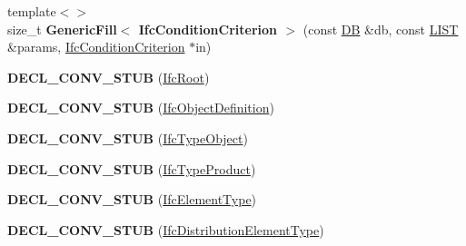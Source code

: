 \begin{DoxyCompactItemize}
\item 
\hypertarget{namespace_assimp_1_1_s_t_e_p_ab615a3b5a5197973a815631e0a058530}{{\footnotesize template$<$$>$ }\\size\+\_\+t {\bfseries Generic\+Fill$<$ Ifc\+Condition\+Criterion $>$} (const \hyperlink{class_assimp_1_1_s_t_e_p_1_1_d_b}{D\+B} \&db, const \hyperlink{class_assimp_1_1_s_t_e_p_1_1_e_x_p_r_e_s_s_1_1_l_i_s_t}{L\+I\+S\+T} \&params, \hyperlink{struct_assimp_1_1_i_f_c_1_1_ifc_condition_criterion}{Ifc\+Condition\+Criterion} $\ast$in)}\label{namespace_assimp_1_1_s_t_e_p_ab615a3b5a5197973a815631e0a058530}

\item 
\hypertarget{namespace_assimp_1_1_s_t_e_p_ae9a162ba612fa18d3e633a23dae32ffc}{{\bfseries D\+E\+C\+L\+\_\+\+C\+O\+N\+V\+\_\+\+S\+T\+U\+B} (\hyperlink{struct_assimp_1_1_i_f_c_1_1_ifc_root}{Ifc\+Root})}\label{namespace_assimp_1_1_s_t_e_p_ae9a162ba612fa18d3e633a23dae32ffc}

\item 
\hypertarget{namespace_assimp_1_1_s_t_e_p_ae728084adb43952848a33ec61d063ce9}{{\bfseries D\+E\+C\+L\+\_\+\+C\+O\+N\+V\+\_\+\+S\+T\+U\+B} (\hyperlink{struct_assimp_1_1_i_f_c_1_1_ifc_object_definition}{Ifc\+Object\+Definition})}\label{namespace_assimp_1_1_s_t_e_p_ae728084adb43952848a33ec61d063ce9}

\item 
\hypertarget{namespace_assimp_1_1_s_t_e_p_aab24e8fcd98e37c6d5ad68ff995aeaa9}{{\bfseries D\+E\+C\+L\+\_\+\+C\+O\+N\+V\+\_\+\+S\+T\+U\+B} (\hyperlink{struct_assimp_1_1_i_f_c_1_1_ifc_type_object}{Ifc\+Type\+Object})}\label{namespace_assimp_1_1_s_t_e_p_aab24e8fcd98e37c6d5ad68ff995aeaa9}

\item 
\hypertarget{namespace_assimp_1_1_s_t_e_p_ae5dd513e88609806922e2d4a7d7b10e2}{{\bfseries D\+E\+C\+L\+\_\+\+C\+O\+N\+V\+\_\+\+S\+T\+U\+B} (\hyperlink{struct_assimp_1_1_i_f_c_1_1_ifc_type_product}{Ifc\+Type\+Product})}\label{namespace_assimp_1_1_s_t_e_p_ae5dd513e88609806922e2d4a7d7b10e2}

\item 
\hypertarget{namespace_assimp_1_1_s_t_e_p_ae273a29a60b383d6e431e1392f3cad8e}{{\bfseries D\+E\+C\+L\+\_\+\+C\+O\+N\+V\+\_\+\+S\+T\+U\+B} (\hyperlink{struct_assimp_1_1_i_f_c_1_1_ifc_element_type}{Ifc\+Element\+Type})}\label{namespace_assimp_1_1_s_t_e_p_ae273a29a60b383d6e431e1392f3cad8e}

\item 
\hypertarget{namespace_assimp_1_1_s_t_e_p_a0d49b5ace7676757349d852c5f7ad870}{{\bfseries D\+E\+C\+L\+\_\+\+C\+O\+N\+V\+\_\+\+S\+T\+U\+B} (\hyperlink{struct_assimp_1_1_i_f_c_1_1_ifc_distribution_element_type}{Ifc\+Distribution\+Element\+Type})}\label{namespace_assimp_1_1_s_t_e_p_a0d49b5ace7676757349d852c5f7ad870}


\end{DoxyCompactItemize}
